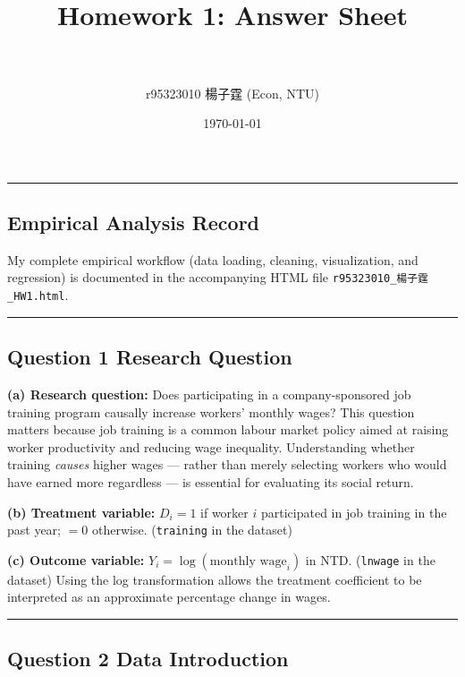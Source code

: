 \documentclass[paper=a4, fontsize=11pt]{scrartcl}
\title{
\normalfont\normalsize
\horrule{0.5pt}\\[0.4cm]
\huge Homework 1: Answer Sheet \\
\horrule{2pt}\\[0.3cm]
}
\author{r95323010 \quad 楊子霆 \quad (Econ, NTU)}
\date{\normalsize\today}
\newcommand{\horrule}[1]{\rule{\linewidth}{#1}}
\begin{document}
\maketitle

\bigskip\horrule{0.4pt}\bigskip

\subsection*{Empirical Analysis Record}

My complete empirical workflow (data loading, cleaning, visualization, and regression)
is documented in the accompanying HTML file \texttt{r95323010\_楊子霆\_HW1.html}.

\bigskip\horrule{0.4pt}\bigskip

\subsection*{Question 1 \quad Research Question}

\textbf{(a) Research question:}
Does participating in a company-sponsored job training program causally increase workers'
monthly wages?
This question matters because job training is a common labour market policy aimed at
raising worker productivity and reducing wage inequality.
Understanding whether training \emph{causes} higher wages --- rather than merely selecting
workers who would have earned more regardless --- is essential for evaluating its social
return.

\textbf{(b) Treatment variable:}
$D_i = 1$ if worker $i$ participated in job training in the past year; $= 0$ otherwise.
(\texttt{training} in the dataset)

\textbf{(c) Outcome variable:}
$Y_i = \log(\text{monthly wage}_i)$ in NTD. (\texttt{lnwage} in the dataset)
Using the log transformation allows the treatment coefficient to be interpreted as an
approximate percentage change in wages.

\bigskip\horrule{0.4pt}\bigskip

\subsection*{Question 2 \quad Data Introduction}
\end{document}
